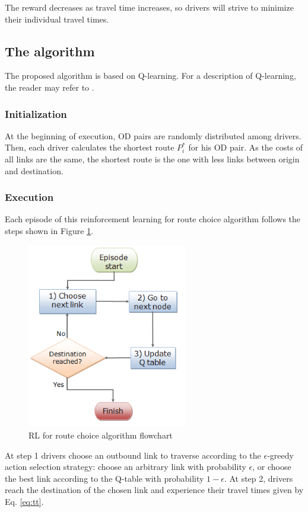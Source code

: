 \documentclass[12pt]{llncs}
\begin{document}
The reward decreases as travel time increases, so drivers will strive to minimize their individual travel times.

\subsection{The algorithm}

The proposed algorithm is based on Q-learning. For a description of Q-learning, the reader may refer to \cite{Watkins&Dayan1992}. 

\subsubsection{Initialization}
At the beginning of execution, OD pairs are randomly distributed among drivers. Then, each driver calculates the shortest route $P_i^*$ for his OD pair. As the costs of all links are the same, the shortest route is the one with less links between origin and destination. 

\subsubsection{Execution}

Each episode of this reinforcement learning for route choice algorithm follows the steps shown in Figure \ref{fig:flowchart}.

\begin{figure}[ht]
    \centerline{\includegraphics[width=7cm]{img/flowchart2.png}}
    \caption{RL for route choice algorithm flowchart}
    \label{fig:flowchart}
\end{figure}

At step 1 drivers choose an outbound link to traverse according to the $\epsilon$-greedy action selection strategy: choose an arbitrary link with probability $\epsilon$, or choose the best link according to the Q-table with probability $1-\epsilon$. At step 2, drivers reach the destination of the chosen link and experience their travel times given by Eq. \eqref{eq:tt}.
\end{document}
